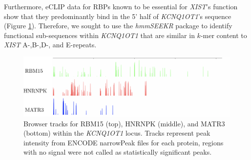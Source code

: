 Furthermore, eCLIP data for RBPs known to be essential for \emph{XIST}'s function show that they predominantly bind in the 5' half of \emph{KCNQ1OT1}'s sequence (Figure \ref{fig:kcnproteins}). Therefore, we sought to use the \emph{hmmSEEKR} package to identify functional sub-sequences within \emph{KCNQ1OT1} that are similar in $k$-mer content to \emph{XIST} A-,B-,D-, and E-repeats. 


\begin{figure}[h!]
\centering
\includegraphics[width=.85\textwidth]{images/kcnproteins.pdf}
\caption[\emph{KCNQ1OT1} RBM15, HNRNPK, and MATR3 eCLIP tracks]{Browser tracks for RBM15 (top), HNRNPK (middle), and MATR3 (bottom) within the \emph{KCNQ1OT1} locus. Tracks represent peak intensity from ENCODE narrowPeak files for each protein, regions with no signal were not called as statistically significant peaks. }
\label{fig:kcnproteins}
\end{figure}

